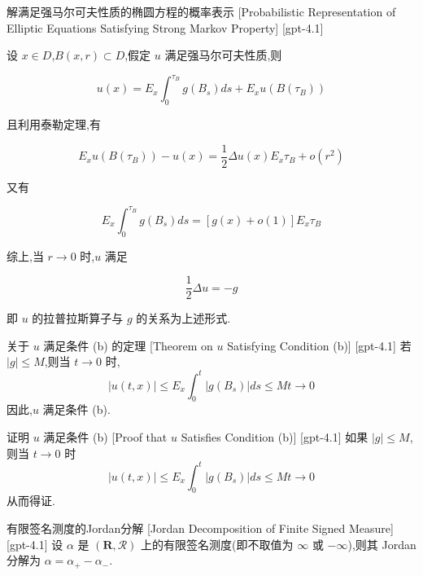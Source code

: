 \documentclass[UTF8]{ctexart}
\begin{document}
    
    
    \begin{thm}
        {解满足强马尔可夫性质的椭圆方程的概率表示}
        [Probabilistic Representation of Elliptic Equations Satisfying Strong Markov Property]
        [gpt-4.1]
        
设 $x \in D$,$B(x, r) \subset D$,假定 $
u$ 满足强马尔可夫性质,则

\[
u(x) = E_x \int_0^{\tau_B} g(B_s) ds + E_x 
u(B(\tau_B))
\]

且利用泰勒定理,有

\[
E_x 
u(B(\tau_B)) - 
u(x) = \frac{1}{2} \Delta 
u(x) E_x \tau_B + o(r^2)
\]

又有

\[
E_x \int_0^{\tau_B} g(B_s) ds = [g(x) + o(1)] E_x \tau_B
\]

综上,当 $r \to 0$ 时,$
u$ 满足

\[
\frac{1}{2} \Delta 
u = -g
\]

即 $
u$ 的拉普拉斯算子与 $g$ 的关系为上述形式.

    \end{thm}
    
    
    
    \begin{thm}
        {关于 $
    u$ 满足条件 (b) 的定理}
        [Theorem on $
    u$ Satisfying Condition (b)]
        [gpt-4.1]
        若 $|g| \leq M$,则当 $t \to 0$ 时,
\[
|
u(t, x)| \leq E_x \int_0^t |g(B_s)| ds \leq Mt \to 0
\]
因此,$
u$ 满足条件 (b).

    \end{thm}
    
    
    
    \begin{prf}
        {证明 $
    u$ 满足条件 (b)}
        [Proof that $
    u$ Satisfies Condition (b)]
        [gpt-4.1]
        如果 $|g| \leq M$,则当 $t \to 0$ 时
\[
|
u(t, x)| \leq E_x \int_0^t |g(B_s)| ds \leq Mt \to 0
\]
从而得证.

    \end{prf}
    
    
    
    \begin{dfn}
        {有限签名测度的Jordan分解}
        [Jordan Decomposition of Finite Signed Measure]
        [gpt-4.1]
        设 $\alpha$ 是 $(\mathbf{R}, \mathcal{R})$ 上的有限签名测度(即不取值为 $\infty$ 或 $-\infty$),则其 Jordan 分解为 $\alpha = \alpha_{+} - \alpha_{-}$.
    \end{dfn}
    
\end{document}
